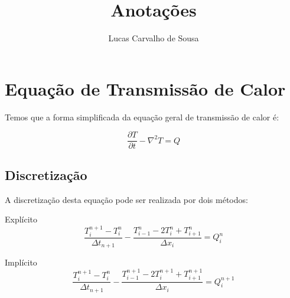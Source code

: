 \documentclass[a4paper]{article}
\title{Anotações}
\author{Lucas Carvalho de Sousa}
\begin{document}
\maketitle

\begin{abstract}

\end{abstract}
\newpage
\section{Equação de Transmissão de Calor}

Temos que a forma simplificada da equação geral de transmissão de calor é:

\begin{equation}
 \frac{\partial T}{\partial t}-\nabla^2 T=Q
\end{equation}

\subsection{Discretização}

A discretização desta equação pode ser realizada por dois métodos:
\begin{list}{Método}{}
 \item[] Explícito
 \begin{equation}
  \dfrac{T^{n+1}_i-T^{n}_i}{\Delta t_{n+1}} - \dfrac{T^{n}_{i-1}-2T^{n}_i+T^{n}_{i+1}}{\Delta x_i} = Q^{n}_i 
 \end{equation}
 \item[] Implícito
 \begin{equation}
  \dfrac{T^{n+1}_i-T^{n}_i}{\Delta t_{n+1}} - \dfrac{T^{n+1}_{i-1}-2T^{n+1}_i+T^{n+1}_{i+1}}{\Delta x_i} = Q^{n+1}_i
 \end{equation}
\end{list}

\FloatBarrier
% 
\end{document}
